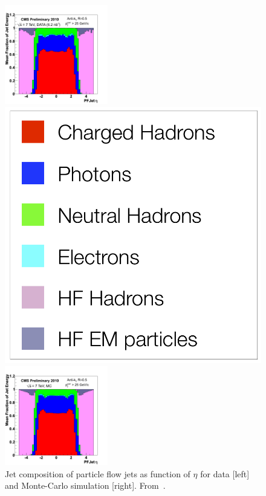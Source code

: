  \begin{figure}[!Hhtbp]
  \begin{center}
    \includegraphics[width=0.4\textwidth]{figs/Jet_composition_data_7TeV.png}
    \begin{minipage}[t]{.15\textwidth}
      \centering
      \includegraphics[width=1.0\textwidth]{figs/Legend_jet_composition.png}
    \end{minipage}
    \includegraphics[width=0.4\textwidth]{figs/Jet_composition_MC_7TeV.png}
    \caption{Jet composition of particle flow jets as function of $\eta$ for data [left] and Monte-Carlo simulation [right]. From~\cite{Beaudette:2014cea}.}
    \label{fig:PFJets}
  \end{center}
\end{figure}

